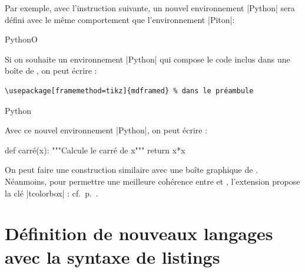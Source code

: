 \documentclass[dvipsnames,svgnames]{article}
\begin{document}
\bigskip
Par exemple, avec l'instruction suivante, un nouvel environnement |{Python}| sera défini
avec le même comportement que l'environnement |{Piton}|:

\medskip
\begin{Code}
\emph{\NewPitonEnvironment}{Python}{O{}}{}{}
\end{Code}

\bigskip
Si on souhaite un environnement |{Python}| qui compose le code inclus dans une boîte de
, on peut écrire :

\begin{footnotesize}
\begin{Verbatim}
\usepackage[framemethod=tikz]{mdframed} % dans le préambule
\end{Verbatim}
\end{footnotesize}

\medskip
\begin{Code}
\emph{\NewPitonEnvironment}{Python}{}
  {\begin{mdframed}[roundcorner=3mm]}
  {\end{mdframed}}
\end{Code}

\bigskip
Avec ce nouvel environnement |{Python}|, on peut écrire : 

\medskip
{}

  {\begin{mdframed}[roundcorner=3mm]}
  {\end{mdframed}}

\begin{Python}
def carré(x):
    """Calcule le carré de x"""
    return x*x
\end{Python}

\bigskip
On peut faire une construction similaire avec une boîte graphique de .
Néanmoins, pour permettre une meilleure cohérence entre  et ,
l'extension  propose la clé |tcolorbox| : cf.~p.~\pageref{tcolorbox}.

\section{Définition de nouveaux langages avec la syntaxe de listings}
\end{document}
